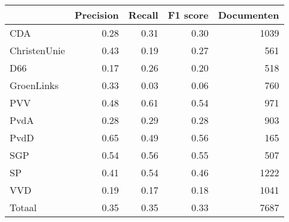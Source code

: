 \begin{tabular}{lrrrr}
\toprule
{} &  Precision &  Recall &  F1 score &  Documenten \\
\midrule
CDA          &       0.28 &    0.31 &      0.30 &        1039 \\
ChristenUnie &       0.43 &    0.19 &      0.27 &         561 \\
D66          &       0.17 &    0.26 &      0.20 &         518 \\
GroenLinks   &       0.33 &    0.03 &      0.06 &         760 \\
PVV          &       0.48 &    0.61 &      0.54 &         971 \\
PvdA         &       0.28 &    0.29 &      0.28 &         903 \\
PvdD         &       0.65 &    0.49 &      0.56 &         165 \\
SGP          &       0.54 &    0.56 &      0.55 &         507 \\
SP           &       0.41 &    0.54 &      0.46 &        1222 \\
VVD          &       0.19 &    0.17 &      0.18 &        1041 \\
Totaal       &       0.35 &    0.35 &      0.33 &        7687 \\
\bottomrule
\end{tabular}
